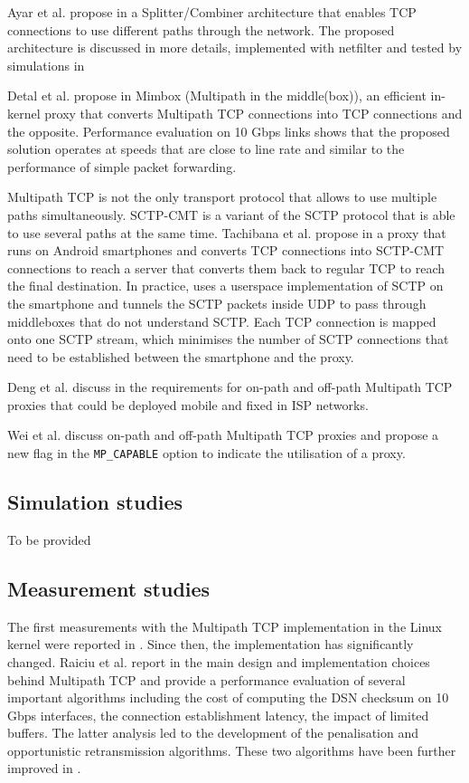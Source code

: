 Ayar et al. propose in \cite{draft-ayar-transparent-sca-proxy-00} a Splitter/Combiner architecture that enables TCP connections to use different paths
through the network. The proposed architecture is discussed in more details, implemented with netfilter and tested by simulations in \cite{Ayar_SCA:2012,Ayar_TCP:2012}

Detal et al. propose in \cite{Detal_Mimbox:2013} Mimbox (Multipath in the middle(box)), an efficient in-kernel proxy that converts Multipath TCP connections into TCP connections and the opposite. Performance evaluation on 10 Gbps links shows that
the proposed solution operates at speeds that are close to line rate and similar to the performance of simple packet forwarding.

Multipath TCP is not the only transport protocol that allows to use multiple paths simultaneously. SCTP-CMT is a variant of the SCTP protocol that is able to use several paths at the same time. Tachibana et al. propose in \cite{Tachibana_proxy:2014} a 
proxy that runs on Android smartphones and converts TCP connections into SCTP-CMT connections to reach a server that
converts them back to regular TCP to reach the final destination.
In practice, \cite{Tachibana_proxy:2014} uses a userspace implementation of SCTP on the smartphone and tunnels the SCTP packets inside UDP to pass through middleboxes that do not 
understand SCTP. Each TCP connection is mapped onto one SCTP stream, which minimises the number of SCTP connections that need to be established between the smartphone and the proxy.

Deng et al. discuss in \cite{draft-deng-mptcp-proxy} the requirements for on-path and off-path Multipath TCP proxies that could be deployed mobile and fixed in ISP networks. 

Wei et al. \cite{draft-wei-mptcp-proxy-mechanism} discuss on-path and off-path Multipath TCP proxies and propose a new flag in the \texttt{MP\_CAPABLE} option to indicate the utilisation of a proxy.

\subsection{Simulation studies}

To be provided

\subsection{Measurement studies}


The first measurements with the Multipath TCP implementation in the Linux kernel were reported in \cite{Barre_Multipath:2011}. Since then, the implementation has significantly changed. Raiciu et al. report in \cite{Raiciu_Hard:2012} the main design and implementation choices behind Multipath TCP and provide a performance evaluation of several important algorithms including the cost of computing the DSN checksum on 10 Gbps interfaces, the connection establishment latency, the impact of limited buffers. The latter analysis led to the development of the penalisation and opportunistic retransmission algorithms. These two algorithms have been further improved in \cite{Paasch_Experimental:2013}.



